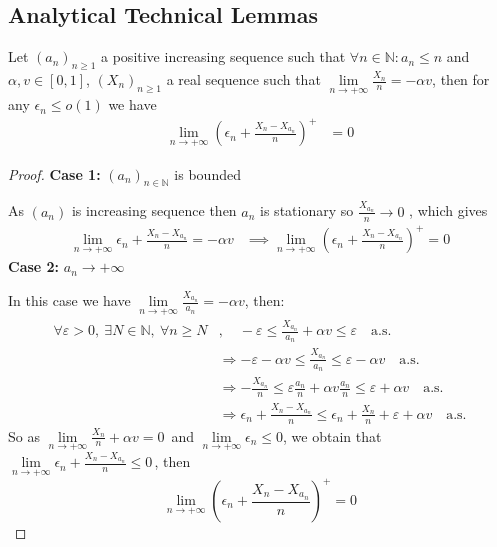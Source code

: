 \subsection{Analytical Technical Lemmas}
\begin{lemma}\label{lem:convergence}
	Let $(a_n)_{n \geq 1}$ a positive increasing sequence such that $\forall n \in \mathbb{N}: a_n \leq n$ and $\alpha, v \in [0,1]$, $(X_n)_{n \geq 1}$ a real sequence such that $\lim\limits_{n \to +\infty} \frac{X_n}{n} = -\alpha v$, then for any \(\epsilon_n \leq o(1)\) we have
\begin{align*}
		\lim\limits_{n \to +\infty}\left( \epsilon_n + \frac{X_n - X_{a_n}}{n} \right)^+ &= 0 
\end{align*}
\end{lemma}

\begin{proof}	
	\textbf{Case 1:} $(a_n)_{n \in \mathbb{N}}$ is bounded
	
	As \((a_n)\) is increasing sequence then \(a_n\) is stationary so \(\frac{X_{a_n}}{n} \longrightarrow 0\) , which gives
	\begin{align*}
		\lim_{n \to +\infty} \epsilon_n + \frac{X_n - X_{a_n}}{n} = -\alpha v
		&\implies \lim_{n \to +\infty} \left(\epsilon_n + \frac{X_n - X_{a_n}}{n}\right)^+ = 0
	\end{align*}	
	\textbf{Case 2:} $a_n \to +\infty$
	
	In this case we have \(\lim\limits_{n \to +\infty} \frac{X_{a_n}}{a_n} = -\alpha v\), then:
	\begin{align*}
		\forall \varepsilon > 0,\ \exists N \in \mathbb{N},\ \forall n \geq N &,\quad -\varepsilon \leq \frac{X_{a_n}}{a_n} + \alpha v \leq \varepsilon \quad \text{a.s.}\\		
		&\Rightarrow -\varepsilon - \alpha v \leq \frac{X_{a_n}}{a_n} \leq \varepsilon - \alpha v \quad \text{a.s.}\\
		&\Rightarrow -\frac{X_{a_n}}{n} \leq \varepsilon \frac{a_n}{n} + \alpha v \frac{a_n}{n} \leq \varepsilon + \alpha v \quad \text{a.s.}\\
		&\Rightarrow \epsilon_n + \frac{X_n - X_{a_n}}{n} \leq \epsilon_n + \frac{X_n}{n} + \varepsilon + \alpha v \quad \text{a.s.}		
	\end{align*}	
	So as \(\lim\limits_{n \to +\infty} \frac{X_n}{n} + \alpha v = 0\,\) and \(\lim\limits_{n \to +\infty} \epsilon_n \leq 0\), we obtain that \(\lim\limits_{n \to +\infty} \epsilon_n + \frac{X_n - X_{a_n}}{n} \leq 0 \,\), then 
	\[\lim\limits_{n \to +\infty} \left(\epsilon_n +\frac{X_n - X_{a_n}}{n}\right)^+ = 0 \]
\end{proof}

